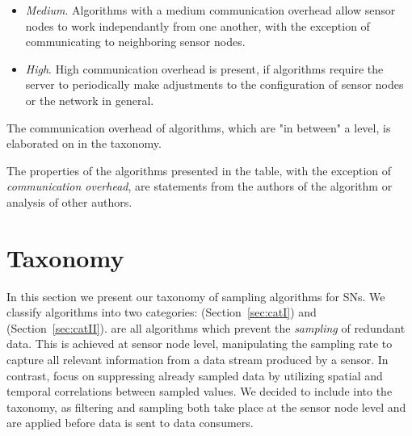 \begin{description}
\begin{itemize}
            \item \textit{Medium}. Algorithms with a medium communication
            overhead allow sensor nodes to work independantly from one another,
            with the exception of communicating to neighboring sensor nodes.

            \item \textit{High}. High communication overhead is present, if
            algorithms require the server to periodically make adjustments to
            the configuration of sensor nodes or the network in general.
        \end{itemize}

        The communication overhead of algorithms, which are "in between" a
        level, is elaborated on in the taxonomy.

        The properties of the algorithms presented in the table, with the
        exception of \textit{communication overhead}, are statements from the
        authors of the algorithm or analysis of other authors.

\end{description}


\section{Taxonomy}
\label{sec:Taxonomy}

In this section we present our taxonomy of sampling algorithms for \acp{SN}. We
classify algorithms into two categories: \catI (Section~\ref{sec:catI}) and
\catII (Section~\ref{sec:catII}). %
\catI are all algorithms which prevent the \textit{sampling} of redundant data.
This is achieved at sensor node level, manipulating the sampling rate to
capture all relevant information from a data stream produced by a sensor. In
contrast, \catII focus on suppressing already sampled data by utilizing spatial
and temporal correlations between sampled values. We decided to include \catII
into the taxonomy, as filtering and sampling both take place at the sensor node
level and are applied before data is sent to data consumers.



